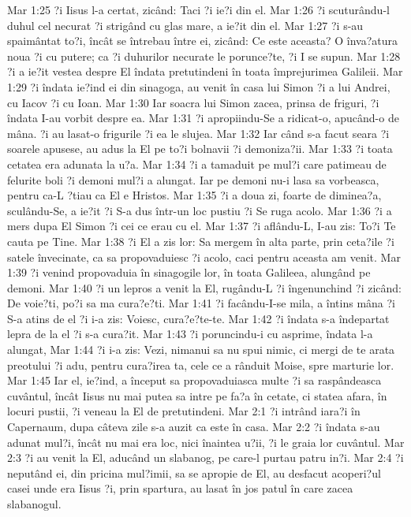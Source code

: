 Mar 1:25  ?i Iisus l-a certat, zicând: Taci ?i ie?i din el.
Mar 1:26  ?i scuturându-l duhul cel necurat ?i strigând cu glas mare, a ie?it din el.
Mar 1:27  ?i s-au spaimântat to?i, încât se întrebau între ei, zicând: Ce este aceasta? O înva?atura noua ?i cu putere; ca ?i duhurilor necurate le porunce?te, ?i I se supun.
Mar 1:28  ?i a ie?it vestea despre El îndata pretutindeni în toata împrejurimea Galileii.
Mar 1:29  ?i îndata ie?ind ei din sinagoga, au venit în casa lui Simon ?i a lui Andrei, cu Iacov ?i cu Ioan.
Mar 1:30  Iar soacra lui Simon zacea, prinsa de friguri, ?i îndata I-au vorbit despre ea.
Mar 1:31  ?i apropiindu-Se a ridicat-o, apucând-o de mâna. ?i au lasat-o frigurile ?i ea le slujea.
Mar 1:32  Iar când s-a facut seara ?i soarele apusese, au adus la El pe to?i bolnavii ?i demoniza?ii.
Mar 1:33  ?i toata cetatea era adunata la u?a.
Mar 1:34  ?i a tamaduit pe mul?i care patimeau de felurite boli ?i demoni mul?i a alungat. Iar pe demoni nu-i lasa sa vorbeasca, pentru ca-L ?tiau ca El e Hristos.
Mar 1:35  ?i a doua zi, foarte de diminea?a, sculându-Se, a ie?it ?i S-a dus într-un loc pustiu ?i Se ruga acolo.
Mar 1:36  ?i a mers dupa El Simon ?i cei ce erau cu el.
Mar 1:37  ?i aflându-L, I-au zis: To?i Te cauta pe Tine.
Mar 1:38  ?i El a zis lor: Sa mergem în alta parte, prin ceta?ile ?i satele învecinate, ca sa propovaduiesc ?i acolo, caci pentru aceasta am venit.
Mar 1:39  ?i venind propovaduia în sinagogile lor, în toata Galileea, alungând pe demoni.
Mar 1:40  ?i un lepros a venit la El, rugându-L ?i îngenunchind ?i zicând: De voie?ti, po?i sa ma cura?e?ti.
Mar 1:41  ?i facându-I-se mila, a întins mâna ?i S-a atins de el ?i i-a zis: Voiesc, cura?e?te-te.
Mar 1:42  ?i îndata s-a îndepartat lepra de la el ?i s-a cura?it.
Mar 1:43  ?i poruncindu-i cu asprime, îndata l-a alungat,
Mar 1:44  ?i i-a zis: Vezi, nimanui sa nu spui nimic, ci mergi de te arata preotului ?i adu, pentru cura?irea ta, cele ce a rânduit Moise, spre marturie lor.
Mar 1:45  Iar el, ie?ind, a început sa propovaduiasca multe ?i sa raspândeasca cuvântul, încât Iisus nu mai putea sa intre pe fa?a în cetate, ci statea afara, în locuri pustii, ?i veneau la El de pretutindeni.
Mar 2:1  ?i intrând iara?i în Capernaum, dupa câteva zile s-a auzit ca este în casa.
Mar 2:2  ?i îndata s-au adunat mul?i, încât nu mai era loc, nici înaintea u?ii, ?i le graia lor cuvântul.
Mar 2:3  ?i au venit la El, aducând un slabanog, pe care-l purtau patru in?i.
Mar 2:4  ?i neputând ei, din pricina mul?imii, sa se apropie de El, au desfacut acoperi?ul casei unde era Iisus ?i, prin spartura, au lasat în jos patul în care zacea slabanogul.
